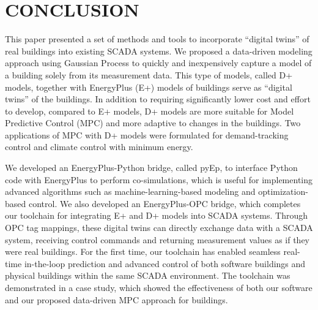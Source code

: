 \section{CONCLUSION}

This paper presented a set of methods and tools to incorporate ``digital twins'' of real buildings into existing SCADA systems.
We proposed a data-driven modeling approach using Gaussian Process to quickly and inexpensively capture a model of a building solely from its measurement data.
This type of models, called D+ models, together with EnergyPlus (E+) models of buildings serve as ``digital twins'' of the buildings.
In addition to requiring significantly lower cost and effort to develop, compared to E+ models, D+ models are more suitable for Model Predictive Control (MPC) and more adaptive to changes in the buildings.
Two applications of MPC with D+ models were formulated for demand-tracking control and climate control with minimum energy.

We developed an EnergyPlus-Python bridge, called pyEp, to interface Python code with EnergyPlus to perform co-simulations, which is useful for implementing advanced algorithms such as machine-learning-based modeling and optimization-based control.
We also developed an EnergyPlus-OPC bridge, which completes our toolchain for integrating E+ and D+ models into SCADA systems.
Through OPC tag mappings, these digital twins can directly exchange data with a SCADA system, receiving control commands and returning measurement values as if they were real buildings.
For the first time, our toolchain has enabled seamless real-time in-the-loop prediction and advanced control of both software buildings and physical buildings within the same SCADA environment.
The toolchain was demonstrated in a case study, which showed the effectiveness of both our software and our proposed data-driven MPC approach for buildings.


